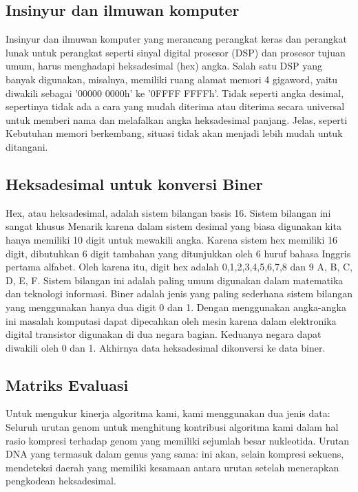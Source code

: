 \subsection{Insinyur dan ilmuwan komputer}
Insinyur dan ilmuwan komputer yang merancang perangkat keras dan perangkat lunak untuk perangkat seperti sinyal digital
prosesor (DSP) dan prosesor tujuan umum, harus menghadapi heksadesimal (hex)
angka. Salah satu DSP yang banyak digunakan, misalnya, memiliki ruang alamat memori 4 gigaword, yaitu
diwakili sebagai '00000 0000h' ke '0FFFF FFFFh'. Tidak seperti angka desimal, sepertinya tidak ada a
cara yang mudah diterima atau diterima secara universal untuk memberi nama dan melafalkan angka heksadesimal panjang. Jelas, seperti
Kebutuhan memori berkembang, situasi tidak akan menjadi lebih mudah untuk ditangani.

\subsection{Heksadesimal untuk konversi Biner}
Hex, atau heksadesimal, adalah sistem bilangan basis 16. Sistem bilangan ini sangat khusus
Menarik karena dalam sistem desimal yang biasa digunakan kita hanya memiliki 10 digit untuk mewakili angka.
Karena sistem hex memiliki 16 digit, dibutuhkan 6 digit tambahan yang ditunjukkan oleh 6 huruf bahasa Inggris pertama
alfabet. Oleh karena itu, digit hex adalah 0,1,2,3,4,5,6,7,8 dan 9 A, B, C, D, E, F. Sistem bilangan ini adalah
paling umum digunakan dalam matematika dan teknologi informasi. Biner adalah jenis yang paling sederhana
sistem bilangan yang menggunakan hanya dua digit 0 dan 1. Dengan menggunakan angka-angka ini masalah komputasi
dapat dipecahkan oleh mesin karena dalam elektronika digital transistor digunakan di dua negara bagian. Keduanya
negara dapat diwakili oleh 0 dan 1. Akhirnya data heksadesimal dikonversi ke data biner.

\subsection{Matriks Evaluasi}
Untuk mengukur kinerja algoritma kami, kami menggunakan dua jenis data:
 Seluruh urutan genom untuk menghitung kontribusi algoritma kami dalam hal rasio kompresi terhadap genom yang memiliki sejumlah besar nukleotida.
 Urutan DNA yang termasuk dalam genus yang sama: ini akan, selain kompresi sekuens, mendeteksi daerah yang memiliki kesamaan antara urutan setelah menerapkan pengkodean heksadesimal.
